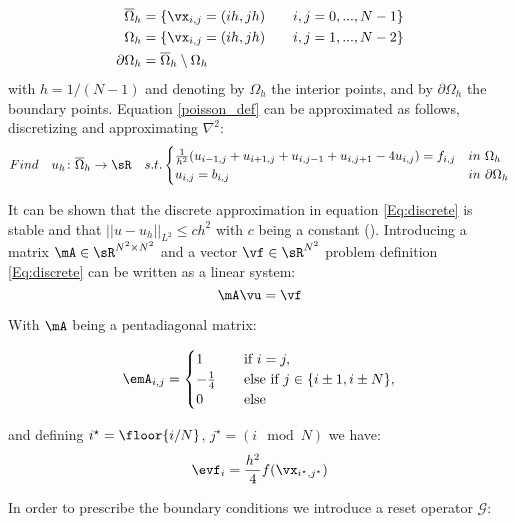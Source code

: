 \documentclass{article} %
\begin{document}
\begin{align*}
\overline{\Omega}_h &= \{\vx_{i,j} = (ih, jh) \qquad i,j = 0,...,N-1 \} \\
{\Omega}_h &= \{\vx_{i,j} = (ih, jh) \qquad i,j = 1,...,N-2 \} \\
\partial\Omega_h &= \overline{\Omega}_h \setminus {\Omega}_h
\end{align*}
with $h=1/(N-1)$ and denoting by ${\Omega}_h$ the interior points, and by $\partial\Omega_h$ the boundary points.
Equation \ref{poisson_def} can be approximated as follows, discretizing and approximating $\nabla^2$:
\begin{equation}
Find \quad u_h \colon \overline{\Omega}_h \to \sR \quad s.t.
\begin{cases}
\frac{1}{h^2}(u_{i-1,j} + u_{i+1,j} + u_{i,j-1} + u_{i,j+1} - 4u_{i,j})=f_{i,j} & in \ \Omega_h \\
u_{i,j} = b_{i,j} & in \ \partial\Omega_h \\
\end{cases}
\label{Eq:discrete}
\end{equation}

It can be shown that the discrete approximation in equation \ref{Eq:discrete} is stable and that $||u-u_h||_{L^2}\leq c h^2$ with $c$ being a constant (\cite{finitedif}).
Introducing a matrix $\mA \in \sR^{N^2\times N^2}$ and a vector $\vf\in \sR^{N^2}$ problem definition \ref{Eq:discrete} can be written as a linear system: 
\begin{equation}
    \mA \vu = \vf
    \label{Eq:system}
\end{equation}

With $\mA$ being a pentadiagonal matrix:

\begin{equation*}
\emA_{i, j} = 
\begin{cases}
    1       & \quad \text{if } i = j, \\
    -\frac{1}{4} & \quad \text{else if } j \in \{i \pm 1, i \pm N\}, \\
    0       & \quad \text{else}
\end{cases}    
\end{equation*}

and defining $i^{\star}=\floor{i/N}$, $j^{\star}=(i\mod N)$ we have:
\begin{align*}
    \evf_i = \frac{h^2}{4}f(\vx_{i^{\star},j^{\star}})
\end{align*}

In order to prescribe the boundary conditions we introduce a reset operator $\mathcal{G}$:
\end{document}
